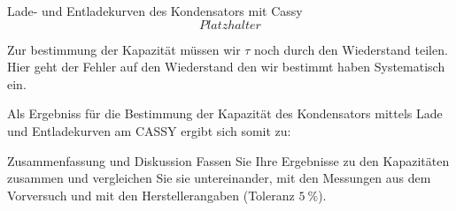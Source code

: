 \documentclass[twoside]{protokoll}
\begin{document}
\begin{aufgabe}{Lade- und Entladekurven des Kondensators mit Cassy}
\begin{equation}
 Platzhalter
\end{equation}

Zur bestimmung der Kapazität müssen wir $\tau$ noch durch den Wiederstand teilen. Hier geht der Fehler auf den Wiederstand den wir bestimmt haben Systematisch ein. 

Als Ergebniss für die Bestimmung der Kapazität des Kondensators mittels Lade und Entladekurven am CASSY ergibt sich somit zu:


\end{aufgabe}

\begin{aufgabe}{Zusammenfassung und Diskussion}
  Fassen Sie Ihre Ergebnisse zu den Kapazitäten zusammen und
  vergleichen Sie sie untereinander, mit den Messungen aus dem
  Vorversuch und mit den Herstellerangaben (Toleranz
  $\SI{5}{\percent}$).  

\end{aufgabe}
 
\end{document}
